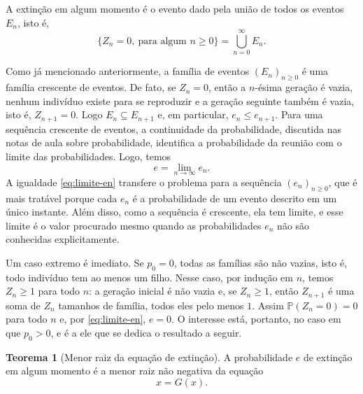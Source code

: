 \documentclass[12pt,portuguese]{article}
\theoremstyle{definition}
\newtheorem{theorem}{Teorema}
\theoremstyle{plainexercise}
\theoremstyle{starredexercise}
\theoremstyle{definition}
\begin{document}
A extinção em algum momento é o evento dado pela união de todos os eventos $E_n$, isto é,
\[
\bigl\{Z_n=0, \ \text{para algum } n\geqslant 0\bigr\}
=\bigcup_{n=0}^{\infty}E_n.
\]

Como já mencionado anteriormente, a família de eventos $(E_n)_{n\geqslant 0}$
é uma família crescente de eventos.
De fato, se $Z_n=0$, então a $n$-ésima
geração é vazia, nenhum indivíduo existe para se reproduzir e a geração
seguinte também é vazia, isto é, $Z_{n+1}=0$. Logo
$E_n\subseteq E_{n+1}$ e, em particular, $e_n\leqslant e_{n+1}$. Para uma
sequência crescente de eventos, a continuidade da probabilidade, discutida
nas notas de aula sobre probabilidade, identifica a probabilidade da
reunião com o limite das probabilidades. Logo, temos
\begin{equation}\label{eq:limite-en}
e=\lim_{n\to\infty}e_n.
\end{equation}
A igualdade \eqref{eq:limite-en} transfere o problema para a sequência
$(e_n)_{n\geqslant 0}$, que é mais tratável porque cada $e_n$ é a probabilidade de um
evento descrito em um único instante. Além disso, como a sequência é
crescente, ela tem limite, e esse limite é o valor procurado mesmo quando
as probabilidades $e_n$ não são conhecidas explicitamente.

Um caso extremo é imediato. Se $p_0=0$, todas as famílias são não vazias,
isto é, todo indivíduo tem ao menos um filho. Nesse caso, por indução em $n$,
temos $Z_n\geqslant 1$ para todo $n$: a geração inicial é não vazia e, se
$Z_n\geqslant 1$, então $Z_{n+1}$ é uma soma de $Z_n$ tamanhos de família,
todos eles pelo menos $1$. Assim
$\mathbb{P}(Z_n=0)=0$ para todo $n$ e, por \eqref{eq:limite-en}, $e=0$.
O interesse está, portanto, no caso em que $p_0>0$, e é a ele que se
dedica o resultado a seguir.

\begin{theorem}[Menor raiz da equação de extinção]\label{thm:extincao-raiz}
A probabilidade $e$ de extinção em algum momento é a menor raiz não
negativa da equação
\begin{equation}\label{eq:equacao-extincao}
x=G(x).
\end{equation}
\end{theorem}
\end{document}
